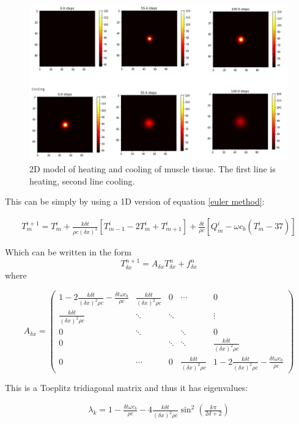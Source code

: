 \documentclass[11pt]{article} %
\begin{document}
\begin{figure}
	\centering
	\includegraphics[width=\linewidth]{"Report_images/2d_homogenous heating and cooling"}
	\caption{2D model of heating and cooling of muscle tissue. The first line is heating, second line cooling.}
	\label{fig:2dhomogenous-heating-and-cooling}
\end{figure}
This can be simply by using a  1D version of equation \ref{euler method}:

\begin{eqnarray}
T^{i+1}_m=T^i_m+\frac{k\delta t}{\rho c (\delta x)^2}[T^i_{m-1}-2T^i_m+T^i_{m+1}]+\frac{\delta t}{\rho c}[Q^i_m-\omega c_b (T^i_m-37)]
\end{eqnarray} 

Which can be written in the form $$ T_{\delta x}^{n+1}=A_{\delta x}T_{\delta x}^{n}+f_{\delta x}^{n} $$
where 

$$ A_{\delta x}= \left( \begin{array}{ccccc}
1- 2\frac{k \delta t}{(\delta x)^2 \rho c} -\frac{\delta t \omega c_b}{\rho c }& \frac{k \delta t}{(\delta x)^2 \rho c} & 0 &\cdots  &0  \\ 
\frac{k \delta t}{(\delta x)^2 \rho c}& \ddots  & \ddots  &  & \vdots \\ 
0& \ddots  &  & \ddots  & 0 \\ 
0&  & \ddots  & \ddots  & \frac{k \delta t}{(\delta x)^2 \rho c} \\ 
0& \cdots &  0&\frac{k \delta t}{(\delta x)^2 \rho c}  & 1- 2\frac{k \delta t}{(\delta x)^2 \rho c} -\frac{\delta t \omega c_b}{\rho c }
\end{array}  \right)  $$

This is a  Toeplitz tridiagonal matrix and thus it has eigenvalues:

\begin{eqnarray}
\lambda_k = 1-\frac{\delta t \omega c_b}{\rho c}-4\frac{k \delta t}{(\delta x)^2 \rho c}\sin^2\left( \frac{k\pi}{2d+2}\right) 
\end{eqnarray}
\end{document}

